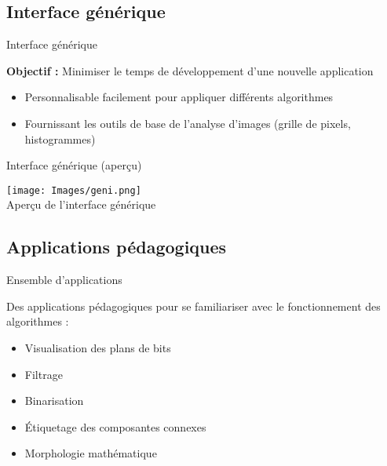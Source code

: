 \subsection{Interface générique}
\begin{frame}{Interface générique}
	
	\textbf{Objectif :} Minimiser le temps de développement d'une nouvelle application
	
	\begin{itemize}
		\item Personnalisable facilement pour appliquer différents algorithmes
		\item Fournissant les outils de base de l'analyse d'images (grille de pixels, histogrammes)
	\end{itemize}

	
\end{frame}

\begin{frame}{Interface générique (aperçu)}
	\begin{center}
		\texttt{[image: Images/geni.png]} \\
		\tiny Aperçu de l'interface générique
	\end{center}	
\end{frame}

\subsection{Applications pédagogiques}
\begin{frame}{Ensemble d'applications}

	Des applications pédagogiques pour se familiariser avec le fonctionnement des algorithmes :
	
	\begin{itemize}
		\item Visualisation des plans de bits
		\item Filtrage
		\item Binarisation
		\item Étiquetage des composantes connexes
		\item Morphologie mathématique
	\end{itemize}

\end{frame}
